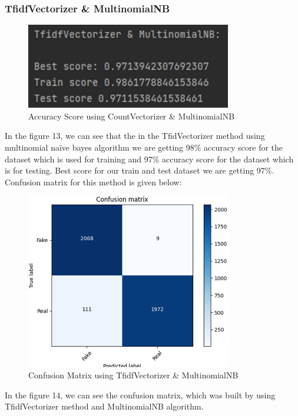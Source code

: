 \documentclass{article}
\begin{document}
    \subsubsection{TfidfVectorizer \& MultinomialNB}
     \begin{figure}[!h]
    \centering
    \includegraphics[width=0.8\textwidth]{image13.png}
    \caption{Accuracy Score using CountVectorizer \& MultinomialNB}
    \label{fig:label}
    \end{figure}\break
    In the figure 13, we can see that the in the TfidVectorizer method using multinomial naïve bayes algorithm we are getting 98\% accuracy score for the dataset which is used for training and 97\% accuracy score for the dataset which is for testing.  Best score for our train and test dataset we are getting 97\%. Confusion matrix for this method is given below:\break
    \begin{figure}[!h]
    \centering
    \includegraphics[width=0.8\textwidth]{image14.png}
    \caption{Confusion Matrix using TfidfVectorizer \& MultinomialNB}
    \label{fig:label}
    \end{figure}\break
    In the figure 14, we can see the confusion matrix, which was built by using TfidfVectorizer method and MultinomialNB algorithm. 
    
\end{document}
